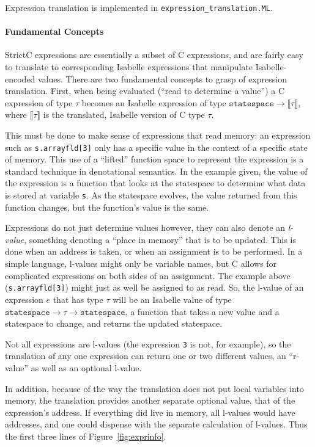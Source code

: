 \documentclass{article}
\newcommand{\strictc}{\textsf{StrictC}}
\newcommand{\MLsuffix}{.ML}
\newcommand{\srcfile}[1]{\texttt{#1}}
\newcommand{\MLfile}[1]{\srcfile{#1\MLsuffix}}
\newcommand{\Sem}[1]{\ensuremath{\llbracket#1\rrbracket}}
\begin{document}
Expression translation is implemented in
\MLfile{expression\_translation}.

\paragraph{Fundamental Concepts}
\strictc{} expressions are essentially a subset of C expressions, and
are fairly easy to translate to corresponding Isabelle expressions
that manipulate Isabelle-encoded values.  There are two fundamental
concepts to grasp of expression translation.  First, when being
evaluated (``read to determine a value'') a C expression of type
$\tau$ becomes an Isabelle expression of type $\texttt{statespace}
\rightarrow \Sem{\tau}$, where $\Sem{\tau}$ is the translated,
Isabelle version of C type $\tau$.

This must be done to make sense of expressions that read memory: an
expression such as \texttt{s.arrayfld[3]} only has a specific value in
the context of a specific state of memory.  This use of a ``lifted''
function space to represent the expression is a standard technique in
denotational semantics.  In the example given, the value of the
expression is a function that looks at the statespace to determine
what data is stored at variable \texttt{s}.  As the statespace
evolves, the value returned from this function changes, but the
function's value is the same.

Expressions do not just determine values however, they can also denote
an \emph{l-value}, something denoting a ``place in memory'' that is to
be updated.  This is done when an address is taken, or when an
assignment is to be performed.  In a simple language, l-values might
only be variable names, but C allows for complicated expressions on
both sides of an assignment.  The example above
(\texttt{s.arrayfld[3]}) might just as well be assigned to as read.
So, the l-value of an expression $e$ that has type $\tau$ will be an
Isabelle value of type $\texttt{statespace} \rightarrow
\tau\rightarrow\texttt{statespace}$, a function that takes a new
value and a statespace to change, and returns the updated statespace.

Not all expressions are l-values (the expression \texttt{3} is not,
for example), so the translation of any one expression can return one
or two different values, an ``r-value'' as well as an optional
l-value.

In addition, because of the way the translation does not put local
variables into memory, the translation provides another separate
optional value, that of the expression's address.  If everything did
live in memory, all l-values would have addresses, and one could
dispense with the separate calculation of l-values.  Thus the first
three lines of Figure~\ref{fig:exprinfo}.
\end{document}
